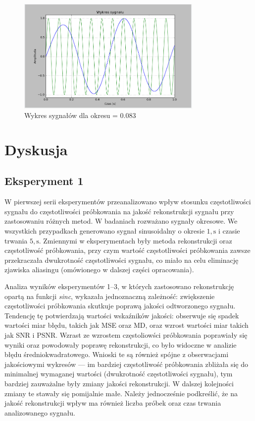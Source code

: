 \documentclass{article}
\begin{document}
    \begin{figure}[h!]
        \centering
        \includegraphics[width=0.8\textwidth]{img/1/anti_3.png}
        \caption{Wykres sygnałów dla okresu = 0.083}
    \end{figure}
    \FloatBarrier
\section{Dyskusja}
    \subsection{Eksperyment 1}
    W pierwszej serii eksperymentów przeanalizowano wpływ stosunku częstotliwości sygnału do częstotliwości 
    próbkowania na jakość rekonstrukcji sygnału przy zastosowaniu różnych metod. W badaniach rozważano 
    sygnały okresowe. We wszystkich przypadkach generowano sygnał sinusoidalny o okresie 
    $1,\mathrm{s}$ i czasie trwania $5,\mathrm{s}$. Zmiennymi w eksperymentach były metoda rekonstrukcji 
    oraz częstotliwość próbkowania, przy czym wartość częstotliwości próbkowania zawsze przekraczała 
    dwukrotność częstotliwości sygnału, co miało na celu eliminację zjawiska aliasingu (omówionego w dalszej 
    części opracowania).

    Analiza wyników eksperymentów 1–3, w których zastosowano rekonstrukcję opartą na funkcji \emph{sinc}, 
    wykazała jednoznaczną zależność: zwiększenie częstotliwości próbkowania skutkuje poprawą jakości odtworzonego 
    sygnału. Tendencję tę potwierdzają wartości wskaźników jakości: obserwuje się spadek wartości miar błędu, 
    takich jak MSE oraz MD, oraz wzrost wartości miar takich jak SNR i PSNR. Wzrast ze wzrostem częstoliowści
    próbkowania poprawiały się wyniki oraz powodowały poprawę rekonstrukcji, co było widoczne w analizie błędu
    średniokwadratowego. Wnioski te są również spójne z obserwacjami 
    jakościowymi wykresów — im bardziej częstotliwość próbkowania zbliżała się do minimalnej wymaganej wartości 
    (dwukrotność częstotliwości sygnału), tym bardziej zauważalne były zmiany jakości rekonstrukcji. 
    W dalszej kolejności zmiany te stawały się pomijalnie małe. Należy jednocześnie podkreślić, że na jakość 
    rekonstrukcji wpływ ma również liczba próbek oraz czas trwania analizowanego sygnału.
\end{document}
